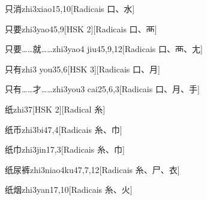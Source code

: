 \begin{entry}{只消}{zhi3xiao1}{5,10}[Radicais ⼝、⽔]
\end{entry}

\begin{entry}{只要}{zhi3yao4}{5,9}[HSK 2][Radicais ⼝、⾑]
\end{entry}

\begin{entry}{只要……就……}{zhi3yao4 jiu4}{5,9,12}[Radicais ⼝、⾑、⼪]
\end{entry}

\begin{entry}{只有}{zhi3 you3}{5,6}[HSK 3][Radicais ⼝、⽉]
\end{entry}

\begin{entry}{只有……才……}{zhi3you3 cai2}{5,6,3}[Radicais ⼝、⽉、⼿]
\end{entry}

\begin{entry}{纸}{zhi3}{7}[HSK 2][Radical ⽷]
\end{entry}

\begin{entry}{纸币}{zhi3bi4}{7,4}[Radicais ⽷、⼱]
\end{entry}

\begin{entry}{纸巾}{zhi3jin1}{7,3}[Radicais ⽷、⼱]
\end{entry}

\begin{entry}{纸尿裤}{zhi3niao4ku4}{7,7,12}[Radicais ⽷、⼫、⾐]
\end{entry}

\begin{entry}{纸烟}{zhi3yan1}{7,10}[Radicais ⽷、⽕]
\end{entry}

